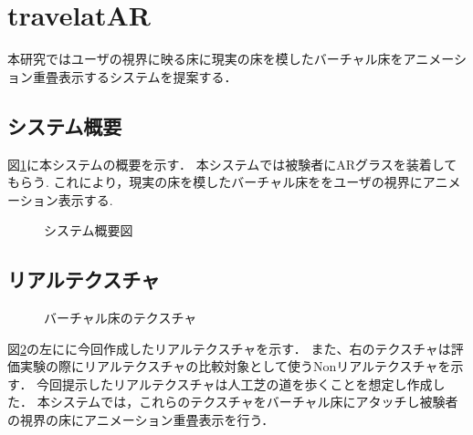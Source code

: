 \documentclass[dvipdfmx]{jsarticle}
\begin{document}
\section{travelatAR}
本研究ではユーザの視界に映る床に現実の床を模したバーチャル床をアニメーション重畳表示するシステムを提案する．


\subsection{システム概要}
図\ref{fig:gaiyo}に本システムの概要を示す．
本システムでは被験者にARグラスを装着してもらう.
これにより，現実の床を模したバーチャル床ををユーザの視界にアニメーション表示する.
\begin{figure}[htbp]
    \centering
    \caption{システム概要図}
    \label{fig:gaiyo}
\end{figure}

\subsection{リアルテクスチャ}
\begin{figure}[htbp]
    \centering
    \caption{バーチャル床のテクスチャ}
    \label{fig:texture}
\end{figure}
図\ref{fig:texture}の左にに今回作成したリアルテクスチャを示す．
また、右のテクスチャは評価実験の際にリアルテクスチャの比較対象として使うNonリアルテクスチャを示す．
今回提示したリアルテクスチャは人工芝の道を歩くことを想定し作成した．
本システムでは，これらのテクスチャをバーチャル床にアタッチし被験者の視界の床にアニメーション重畳表示を行う．
\end{document}

